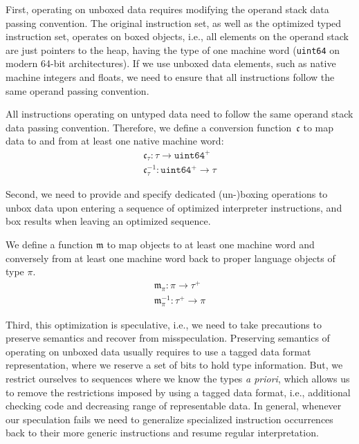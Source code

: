 \documentclass[preprint,10pt]{popl14conf}
\begin{document}
First, operating on unboxed data requires modifying the operand stack data passing convention.
The original instruction set, as well as the optimized typed instruction set, operates on boxed
objects, i.e., all elements on the operand stack are just pointers to the heap, having the type of
one machine word (\texttt{uint64} on modern 64-bit architectures).
If we use unboxed data elements, such as native machine integers and floats, we need to ensure that
all instructions follow the same operand passing convention.

\begin{defn}
  All instructions operating on untyped data need to follow the same operand stack data passing
  convention.
  Therefore, we define a conversion function~$\mathfrak{c}$ to map data to and from at least one
  native machine word:
  \begin{eqnarray}
    \label{eq:stack-conversion}
    \mathfrak{c}_{\tau}: \tau \rightarrow \mathtt{uint64}^{+}\\
    \mathfrak{c}_{\tau}^{-1}: \mathtt{uint64}^{+} \rightarrow \tau
  \end{eqnarray}
\end{defn}

Second, we need to provide and specify dedicated (un-)boxing operations to unbox data upon entering a
sequence of optimized interpreter instructions, and box results when leaving an optimized sequence.
\begin{defn}
  We define a function $\mathfrak{m}$ to map objects to at least one machine word and conversely
  from at least one machine word back to proper language objects of type $\pi$.
  \begin{eqnarray}
    \label{eq:stack-conversion}
    \mathfrak{m}_{\pi}: \pi \rightarrow \tau^{+}\\
    \mathfrak{m}_{\pi}^{-1}: \tau^{+} \rightarrow \pi
  \end{eqnarray}
\end{defn}
Third, this optimization is speculative, i.e., we need to take precautions to preserve semantics
and recover from misspeculation.
Preserving semantics of operating on unboxed data usually requires to use a tagged data format
representation, where we reserve a set of bits to hold type information.
But, we restrict ourselves to sequences where we know the types \emph{a priori}, which allows us to
remove the restrictions imposed by using a tagged data format, i.e., additional checking code and
decreasing range of representable data.
In general, whenever our speculation fails we need to generalize specialized instruction
occurrences back to their more generic instructions and resume regular interpretation.
\end{document}

